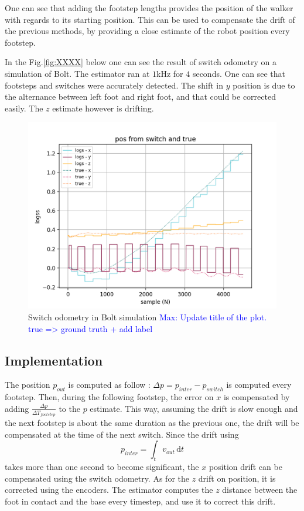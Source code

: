 \documentclass[a4paper,10pt]{article}
\newcommand{\mnaveau}[1]{\textcolor{blue}{Max: #1}}
\begin{document}
One can see that adding the footstep lengths provides the position of the walker with regards to its starting position. This can be used to compensate the drift of the previous methods, by providing a close estimate of the robot position every footstep.


In the Fig.\ref{fig:XXXX} below one can see the result of switch odometry on a simulation of Bolt. The estimator ran at $1$kHz for $4$ seconds. One can see that footsteps and switches were accurately detected. The shift in $y$ position is due to the alternance between left foot and right foot, and that could be corrected easily. The $z$ estimate however is drifting. 



\begin{figure}[H]
\centering
  \includegraphics[width=\linewidth, angle=0, scale=0.7]{./images/switch_odometry.png}
  \caption{Switch odometry in Bolt simulation \mnaveau{Update title of the plot. true => ground truth + add label}}
\end{figure}

\subsection{Implementation}

The position $p_{out}$ is computed as follow : $\Delta p = p_{inter} - p_{switch}$ is computed every footstep. Then, during the following footstep, the error on $x$ is compensated by adding $\frac{\Delta p}{\Delta T_{footstep}}$ to the $p$ estimate. This way, assuming the drift is slow enough and the next footstep is about the same duration as the previous one, the drift will be compensated at the time of the next switch. Since the drift using 
$$ p_{inter} = \int_t v_{out} \, \mathrm{d}t $$
takes more than one second to become significant, the $x$ position drift can be compensated using the switch odometry.
As for the $z$ drift on position, it is corrected using the encoders. The estimator computes the $z$ distance between the foot in contact and the base every timestep, and use it to correct this drift.
\end{document}
